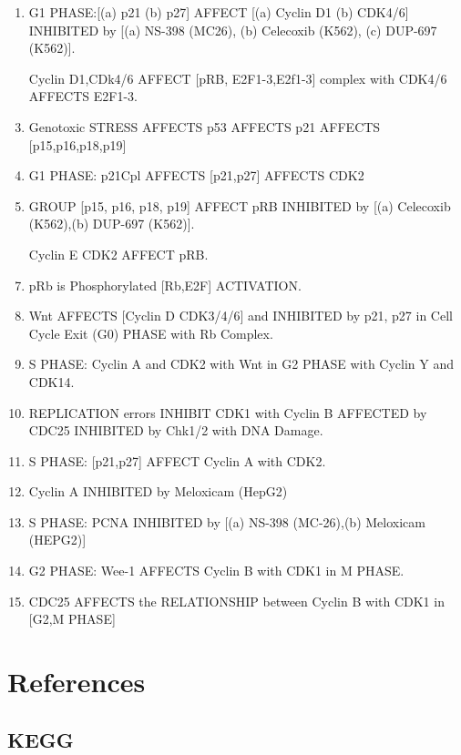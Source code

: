 \begin{enumerate}
	\item G1 PHASE:[(a) p21 (b) p27] AFFECT [(a) Cyclin D1 (b) CDK4/6] INHIBITED by [(a) NS-398 (MC26), (b) Celecoxib (K562), (c) DUP-697 (K562)]. \cite{key4000}
	\item [Cyclin D1,CDk4/6] AFFECT [pRB, E2F1-3,E2f1-3] complex with CDK4/6 AFFECTS E2F1-3. \cite{key4000}
	\item Genotoxic STRESS AFFECTS p53 AFFECTS p21 AFFECTS [p15,p16,p18,p19] \cite{key4000}
	\item G1 PHASE: p21Cpl AFFECTS [p21,p27] AFFECTS CDK2 \cite{key4000}
	\item GROUP [p15, p16, p18, p19] AFFECT pRB INHIBITED by [(a) Celecoxib (K562),(b) DUP-697 (K562)]. \cite{key4000} 
	\item [Cyclin E CDK2] AFFECT pRB.  \cite{key4000}
	\item pRb is Phosphorylated [Rb,E2F] ACTIVATION. \cite{key4000}
	\item Wnt AFFECTS [Cyclin D CDK3/4/6] and INHIBITED by p21, p27 in Cell Cycle Exit (G0) PHASE with Rb Complex. \cite{key4000}
	\item S PHASE: Cyclin A and CDK2 with Wnt in G2 PHASE with Cyclin Y and CDK14.  \cite{key4000}
	\item REPLICATION errors INHIBIT CDK1 with Cyclin B AFFECTED by CDC25 INHIBITED by Chk1/2 with DNA Damage. \cite{key4000}
	\item S PHASE: [p21,p27] AFFECT Cyclin A with CDK2. \cite{key4000}
	\item Cyclin A INHIBITED by Meloxicam (HepG2) \cite{key4000}
	\item S PHASE: PCNA INHIBITED by [(a) NS-398 (MC-26),(b) Meloxicam (HEPG2)] \cite{key4000}
	\item G2 PHASE: Wee-1 AFFECTS Cyclin B with CDK1 in M PHASE.  \cite{key4000}
	\item CDC25 AFFECTS the RELATIONSHIP between Cyclin B with CDK1 in [G2,M PHASE] \cite{key4000}	
\end{enumerate}


\section{References}

\subsection{KEGG}

